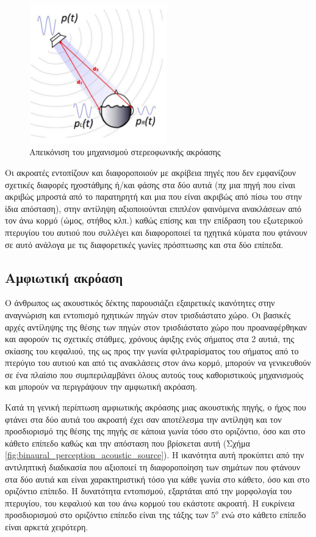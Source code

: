 \begin{figure}[h]
  \centering
  \includegraphics[width=6cm, height=6cm]{images/stereo_listening_mechanism.png}
  \caption{Απεικόνιση του μηχανισμού στερεοφωνικής ακρόασης}
  \label{fig:stereo_listening_mechanism}
\end{figure}

Οι ακροατές εντοπίζουν και διαφοροποιούν με ακρίβεια πηγές που δεν εμφανίζουν σχετικές διαφορές ηχοστάθμης ή/και φάσης στα δύο αυτιά (πχ μια πηγή που είναι ακριβώς μπροστά από το παρατηρητή και μια που είναι ακριβώς από πίσω του στην ίδια απόσταση), στην αντίληψη αξιοποιούνται επιπλέον φαινόμενα ανακλάσεων από τον άνω κορμό (ώμος, στήθος κλπ.) καθώς επίσης και την επίδραση του εξωτερικού πτερυγίου του αυτιού που συλλέγει και διαφοροποιεί τα ηχητικά κύματα που φτάνουν σε αυτό ανάλογα με τις διαφορετικές γωνίες πρόσπτωσης και στα δύο επίπεδα.

\subsection{Αμφιωτική ακρόαση}

Ο άνθρωπος ως ακουστικός δέκτης παρουσιάζει εξαιρετικές ικανότητες στην αναγνώριση και εντοπισμό ηχητικών πηγών στον τρισδιάστατο χώρο. Οι βασικές αρχές αντίληψης της θέσης των πηγών στον τρισδιάστατο χώρο που προαναφέρθηκαν και αφορούν τις σχετικές στάθμες, χρόνους άφιξης ενός σήματος στα 2 αυτιά, της σκίασης του κεφαλιού, της ως προς την γωνία φιλτραρίσματος του σήματος από το πτερύγιο του αυτιού και από τις ανακλάσεις στον άνω κορμό, μπορούν να γενικευθούν σε ένα πλαίσιο που συμπεριλαμβάνει όλους αυτούς τους καθοριστικούς μηχανισμούς και μπορούν να περιγράψουν την αμφιωτική ακρόαση.

Κατά τη γενική περίπτωση αμφιωτικής ακρόασης μιας ακουστικής πηγής, ο ήχος που φτάνει στα δύο αυτιά του ακροατή έχει σαν αποτέλεσμα την αντίληψη και τον προσδιορισμό της θέσης της πηγής σε κάποια γωνία τόσο στο οριζόντιο, όσο και στο κάθετο επίπεδο καθώς και την απόσταση που βρίσκεται αυτή (Σχήμα \ref{fig:binaural_perception_acoustic_source}). Η ικανότητα αυτή προκύπτει από την αντιληπτική διαδικασία που αξιοποιεί τη διαφοροποίηση των σημάτων που φτάνουν στα δύο αυτιά και είναι χαρακτηριστική τόσο για κάθε γωνία στο κάθετο, όσο και στο οριζόντιο επίπεδο. Η δυνατότητα εντοπισμού, εξαρτάται από την μορφολογία του πτερυγίου, του κεφαλιού και του άνω κορμού του εκάστοτε ακροατή. Η ευκρίνεια προσδιορισμού στο οριζόντιο επίπεδο είναι της τάξης των $5^o$ ενώ στο κάθετο επίπεδο είναι αρκετά χειρότερη.

